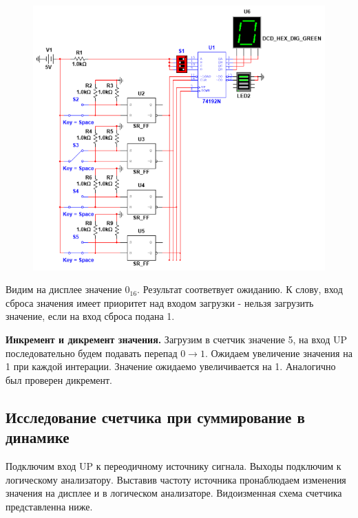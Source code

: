 \begin{figure}[h!]
    \centering
    \includegraphics[scale=0.8]{images/image-10.png}
    \label{image:10}
\end{figure}

Видим на дисплее значение $0_{16}$. Результат соответвует ожиданию. К слову, вход сброса значения имеет приоритет над входом загрузки - 
нельзя загрузить значение, если на вход сброса подана 1. \par

\textbf{Инкремент и дикремент значения.} Загрузим в счетчик значение 5, на вход UP последовательно будем подавать перепад $0 \rightarrow 1$.
Ожидаем увеличение значения на 1 при каждой интерации. Значение ожидаемо увеличивается на 1. Аналогично был проверен дикремент.

\newpage

\subsection*{Исследование счетчика при суммирование в динамике}

Подключим вход UP к переодичному источнику сигнала. Выходы подключим к логическому анализатору. Выставив 
частоту источника пронаблюдаем изменения значения на дисплее и в логическом анализаторе. Видоизменная схема
счетчика представленна ниже. \par

